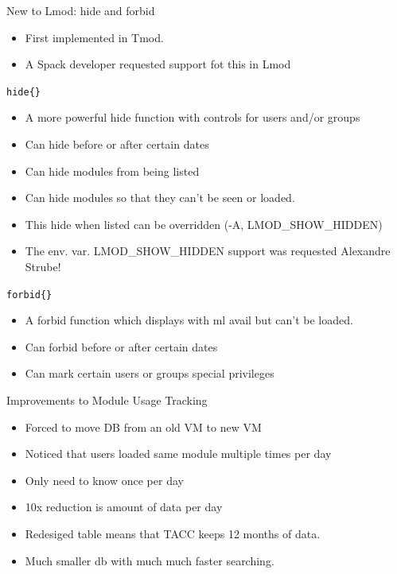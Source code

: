 \documentclass{beamer}
\begin{document}
\begin{frame}{New to Lmod: hide and forbid}
  \begin{itemize}
    \item First implemented in Tmod.
    \item A Spack developer requested support fot this in Lmod
  \end{itemize}
\end{frame}

\begin{frame}{\texttt{hide\{\}}}
  \begin{itemize}
    \item A more powerful hide function with controls for users and/or
      groups
    \item Can hide before or after certain dates
    \item Can hide modules from being listed
    \item Can hide modules so that they can't be seen or loaded.
    \item This hide when listed can be overridden (-A, LMOD\_SHOW\_HIDDEN)
    \item The env. var.  LMOD\_SHOW\_HIDDEN support was requested Alexandre Strube!
  \end{itemize}
\end{frame}

\begin{frame}{\texttt{forbid\{\}}}
  \begin{itemize}
    \item A forbid function which displays with ml avail but can't be loaded.
    \item Can forbid before or after certain dates
    \item Can mark certain users or groups special privileges
  \end{itemize}
\end{frame}

\begin{frame}{Improvements to Module Usage Tracking}
  \begin{itemize}
    \item Forced to move DB from an old VM to new VM
    \item Noticed that users loaded same module multiple times per day
    \item Only need to know once per day
    \item 10x reduction is amount of data per day
    \item Redesiged table means that TACC keeps 12 months of data.
    \item Much smaller db with much much faster searching.
  \end{itemize}
\end{frame}
\end{document}
